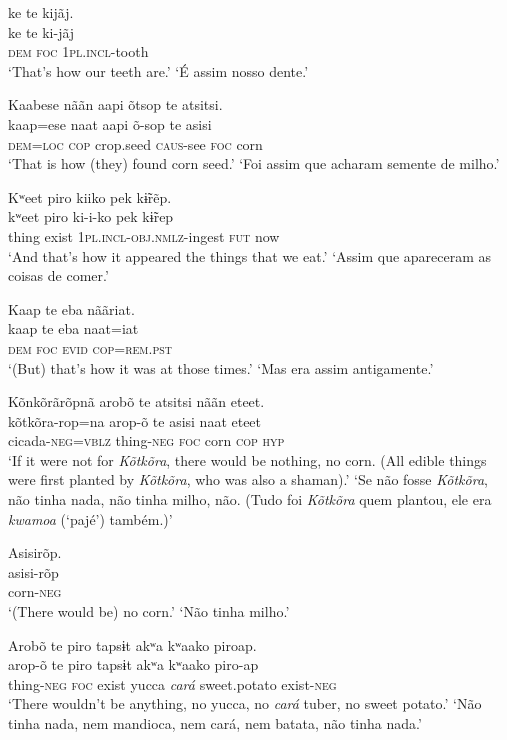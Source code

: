 \documentclass[output=paper,
modfonts,nonflat
]{langsci/langscibook}
\begin{document}
\ea ke te kijãj.\\[.3em]
\gll ke te ki-jãj\\
     \textsc{dem} \textsc{foc} \textsc{1pl.incl}-tooth\\
\glt ‘That's how our teeth are.’
\glt ‘É assim nosso dente.'
\z 

\ea Kaabese nããn aapi õtsop te atsitsi.\\[.3em]
\gll kaap=ese naat aapi õ-sop te asisi\\
     \textsc{dem}=\textsc{loc} \textsc{cop} crop.seed \textsc{caus}-see \textsc{foc} corn\\
\glt ‘That is how (they) found corn seed.’
\glt ‘Foi assim que acharam semente de milho.'
\z 

 
\ea Kʷeet piro kiiko pek kɨ̃rẽp.\\[.3em]
\gll kʷeet piro ki-i-ko pek kɨ̃rep\\
     thing exist \textsc{1pl.incl}-\textsc{obj.nmlz}-ingest \textsc{fut} now\\
\glt ‘And that's how it appeared the things that we eat.’
\glt ‘Assim que apareceram as coisas de comer.'
\z 

\ea Kaap te eba nããriat.\\[.3em]
\gll kaap te eba naat=iat\\
     \textsc{dem} \textsc{foc} \textsc{evid} \textsc{cop}=\textsc{rem.pst}\\
\glt ‘(But) that's how it was at those times.’
\glt ‘Mas era assim antigamente.'
\z 


\ea Kõnkõrãrõpnã arobõ te atsitsi nããn eteet.\\[.3em]
\gll kõtkõra-rop=na arop-õ te asisi naat eteet\\
     cicada-\textsc{neg}=\textsc{vblz} thing-\textsc{neg} \textsc{foc} corn \textsc{cop} \textsc{hyp}\\
\glt ‘If it were not for \textit{Kõtkõra}, there would be nothing, no corn. (All edible things were first planted by \textit{Kõtkõra}, who was also a shaman).'
\glt ‘Se não fosse \textit{Kõtkõra}, não tinha nada, não tinha milho, não. (Tudo foi \textit{Kõtkõra} quem plantou, ele era \textit{kwamoa} (‘pajé') também.)' 

\z 

\ea Asisirõp.\\[.3em]
\gll asisi-rõp\\
     corn-\textsc{neg}\\
\glt ‘(There would be) no corn.’
\glt ‘Não tinha milho.'
\z 

\ea Arobõ te piro tapsɨt akʷa kʷaako piroap.\\[.3em]
\gll arop-õ te piro tapsɨt akʷa kʷaako piro-ap\\
     thing-\textsc{neg} \textsc{foc} exist yucca \textit{cará} sweet.potato exist-\textsc{neg}\\
\glt ‘There wouldn't be anything, no yucca, no \textit{cará} tuber, no sweet potato.’
\glt ‘Não tinha nada, nem mandioca, nem cará, nem batata, não tinha nada.'
\z 
\end{document}
